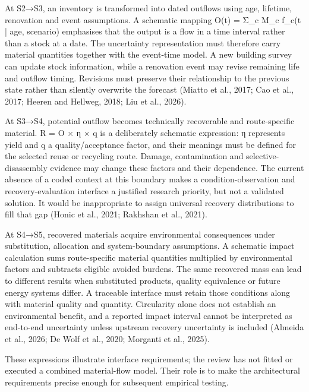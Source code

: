 At S2→S3, an inventory is transformed into dated outflows using age, lifetime, renovation and event assumptions. A schematic mapping O(t) = Σ\_c M\_c f\_c(t | age, scenario) emphasises that the output is a flow in a time interval rather than a stock at a date. The uncertainty representation must therefore carry material quantities together with the event-time model. A new building survey can update stock information, while a renovation event may revise remaining life and outflow timing. Revisions must preserve their relationship to the previous state rather than silently overwrite the forecast (Miatto et al., 2017; Cao et al., 2017; Heeren and Hellweg, 2018; Liu et al., 2026).

At S3→S4, potential outflow becomes technically recoverable and route-specific material. R = O × η × q is a deliberately schematic expression: η represents yield and q a quality/acceptance factor, and their meanings must be defined for the selected reuse or recycling route. Damage, contamination and selective-disassembly evidence may change these factors and their dependence. The current absence of a coded context at this boundary makes a condition-observation and recovery-evaluation interface a justified research priority, but not a validated solution. It would be inappropriate to assign universal recovery distributions to fill that gap (Honic et al., 2021; Rakhshan et al., 2021).

At S4→S5, recovered materials acquire environmental consequences under substitution, allocation and system-boundary assumptions. A schematic impact calculation sums route-specific material quantities multiplied by environmental factors and subtracts eligible avoided burdens. The same recovered mass can lead to different results when substituted products, quality equivalence or future energy systems differ. A traceable interface must retain those conditions along with material quality and quantity. Circularity alone does not establish an environmental benefit, and a reported impact interval cannot be interpreted as end-to-end uncertainty unless upstream recovery uncertainty is included (Almeida et al., 2026; De Wolf et al., 2020; Morganti et al., 2025).

These expressions illustrate interface requirements; the review has not fitted or executed a combined material-flow model. Their role is to make the architectural requirements precise enough for subsequent empirical testing.


